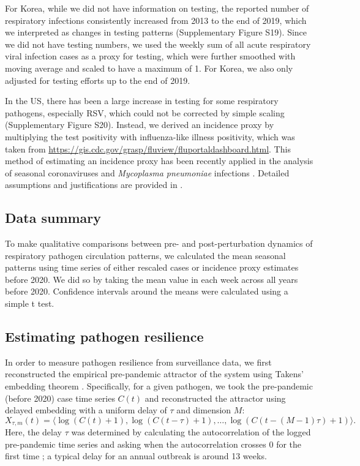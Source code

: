 \documentclass[12pt]{article}
\begin{document}
For Korea, while we did not have information on testing, the reported number of respiratory infections consistently increased from 2013 to the end of 2019, which we interpreted as changes in testing patterns (Supplementary Figure S19).
Since we did not have testing numbers, we used the weekly sum of all acute respiratory viral infection cases as a proxy for testing, which were further smoothed with moving average and scaled to have a maximum of 1.
For Korea, we also only adjusted for testing efforts up to the end of 2019.

In the US, there has been a large increase in testing for some respiratory pathogens, especially RSV, which could not be corrected by simple scaling (Supplementary Figure S20).
Instead, we derived an incidence proxy by multiplying the test positivity with influenza-like illness positivity, which was taken from \url{https://gis.cdc.gov/grasp/fluview/fluportaldashboard.html}.
This method of estimating an incidence proxy has been recently applied in the analysis of seasonal coronaviruses \citep{kissler2020projecting} and \textit{Mycoplasma pneumoniae} infections \citep{park2024predicting}.
Detailed assumptions and justifications are provided in \citep{goldstein2011predicting}.

\subsection*{Data summary}

To make qualitative comparisons between pre- and post-perturbation dynamics of respiratory pathogen circulation patterns, we calculated the mean seasonal patterns using time series of either rescaled cases or incidence proxy estimates before 2020.
We did so by taking the mean value in each week across all years before 2020.
Confidence intervals around the means were calculated using a simple t test.

\subsection*{Estimating pathogen resilience}

In order to measure pathogen resilience from surveillance data, we first reconstructed the empirical pre-pandemic attractor of the system using Takens' embedding theorem \citep{takens2006detecting}.
Specifically, for a given pathogen, we took the pre-pandemic (before 2020) case time series $C(t)$ and reconstructed the attractor using delayed embedding with a uniform delay of $\tau$ and dimension $M$:
\begin{equation}
X_{\tau,m}(t) = \langle\log(C(t)+1), \log(C(t-\tau)+1), \dots, \log(C(t-(M-1)\tau)+1)\rangle.
\end{equation}
Here, the delay $\tau$ was determined by calculating the autocorrelation of the logged pre-pandemic time series and asking when the autocorrelation crosses 0 for the first time \citep{tan2023selecting};
a typical delay for an annual outbreak is around 13 weeks.
\end{document}
